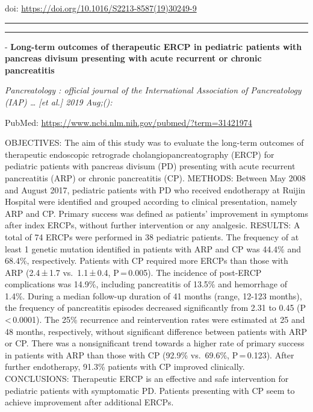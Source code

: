\documentclass[]{article}
\begin{document}
doi: \url{https://doi.org/10.1016/S2213-8587(19)30249-9}

{}

{}

\begin{center}\rule{0.5\linewidth}{\linethickness}\end{center}

\begin{center}\rule{0.5\linewidth}{\linethickness}\end{center}

 - \textbf{Long-term outcomes of therapeutic ERCP in pediatric patients
with pancreas divisum presenting with acute recurrent or chronic
pancreatitis}

\emph{Pancreatology : official journal of the International Association
of Pancreatology (IAP) \ldots{} {[}et al.{]} 2019 Aug;():}

PubMed: \url{https://www.ncbi.nlm.nih.gov/pubmed/?term=31421974}

OBJECTIVES: The aim of this study was to evaluate the long-term outcomes
of therapeutic endoscopic retrograde cholangiopancreatography (ERCP) for
pediatric patients with pancreas divisum (PD) presenting with acute
recurrent pancreatitis (ARP) or chronic pancreatitis (CP). METHODS:
Between May 2008 and August 2017, pediatric patients with PD who
received endotherapy at Ruijin Hospital were identified and grouped
according to clinical presentation, namely ARP and CP. Primary success
was defined as patients' improvement in symptoms after index ERCPs,
without further intervention or any analgesic. RESULTS: A total of 74
ERCPs were performed in 38 pediatric patients. The frequency of at least
1 genetic mutation identified in patients with ARP and CP was 44.4\% and
68.4\%, respectively. Patients with CP required more ERCPs than those
with ARP (2.4\,±\,1.7 vs.~1.1\,±\,0.4, P\,=\,0.005). The incidence of
post-ERCP complications was 14.9\%, including pancreatitis of 13.5\% and
hemorrhage of 1.4\%. During a median follow-up duration of 41 months
(range, 12-123 months), the frequency of pancreatitis episodes decreased
significantly from 2.31 to 0.45 (P\,\textless{}\,0.0001). The 25\%
recurrence and reintervention rates were estimated at 25 and 48 months,
respectively, without significant difference between patients with ARP
or CP. There was a nonsignificant trend towards a higher rate of primary
success in patients with ARP than those with CP (92.9\% vs.~69.6\%,
P\,=\,0.123). After further endotherapy, 91.3\% patients with CP
improved clinically. CONCLUSIONS: Therapeutic ERCP is an effective and
safe intervention for pediatric patients with symptomatic PD. Patients
presenting with CP seem to achieve improvement after additional ERCPs.
\end{document}
